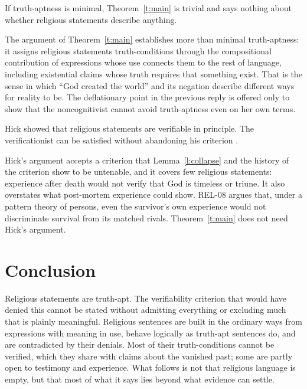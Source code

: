 \documentclass{situationist-preprint}
\begin{document}
\begin{objection}[Triviality]
If truth-aptness is minimal, Theorem~\ref{t:main} is trivial and says nothing about whether religious statements describe anything.
\end{objection}

\begin{reply}
The argument of Theorem~\ref{t:main} establishes more than minimal truth-aptness: it assigns religious statements truth-conditions through the compositional contribution of expressions whose use connects them to the rest of language, including existential claims whose truth requires that something exist. That is the sense in which \enquote{God created the world} and its negation describe different ways for reality to be. The deflationary point in the previous reply is offered only to show that the noncognitivist cannot avoid truth-aptness even on her own terms.
\end{reply}

\begin{objection}
Hick showed that religious statements are verifiable in principle. The verificationist can be satisfied without abandoning his criterion \citep{Hick1960}.
\end{objection}

\begin{reply}
Hick's argument accepts a criterion that Lemma~\ref{l:collapse} and the history of the criterion show to be untenable, and it covers few religious statements: experience after death would not verify that God is timeless or triune. It also overstates what post-mortem experience could show. REL-08 argues that, under a pattern theory of persons, even the survivor's own experience would not discriminate survival from its matched rivals. Theorem~\ref{t:main} does not need Hick's argument.
\end{reply}

\section{Conclusion}

Religious statements are truth-apt. The verifiability criterion that would have denied this cannot be stated without admitting everything or excluding much that is plainly meaningful. Religious sentences are built in the ordinary ways from expressions with meaning in use, behave logically as truth-apt sentences do, and are contradicted by their denials. Most of their truth-conditions cannot be verified, which they share with claims about the vanished past; some are partly open to testimony and experience. What follows is not that religious language is empty, but that most of what it says lies beyond what evidence can settle.
\end{document}
